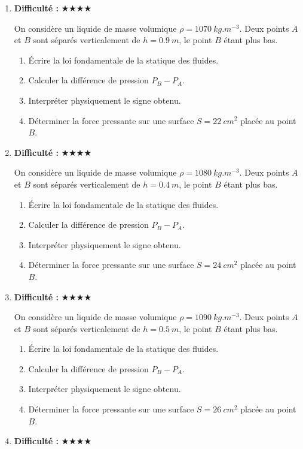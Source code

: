 \documentclass[11pt,a4paper]{article}
\newcommand{\etoiles}[1]{\textbf{Difficulté : }#1}
\begin{document}
\begin{enumerate}[label=\textbf{Exercice \arabic*.},leftmargin=*]
On considère un liquide de masse volumique $\rho=1060\ \si{kg.m^{-3}}$.
Deux points $A$ et $B$ sont séparés verticalement de $h=0.8\ \si{m}$, le point $B$ étant plus bas.
\begin{enumerate}[label=\alph*)]
\item Écrire la loi fondamentale de la statique des fluides.
\item Calculer la différence de pression $P_B-P_A$.
\item Interpréter physiquement le signe obtenu.
\item Déterminer la force pressante sur une surface $S=20\ \si{cm^2}$ placée au point $B$.
\end{enumerate}
\item \etoiles{★★★★}

On considère un liquide de masse volumique $\rho=1070\ \si{kg.m^{-3}}$.
Deux points $A$ et $B$ sont séparés verticalement de $h=0.9\ \si{m}$, le point $B$ étant plus bas.
\begin{enumerate}[label=\alph*)]
\item Écrire la loi fondamentale de la statique des fluides.
\item Calculer la différence de pression $P_B-P_A$.
\item Interpréter physiquement le signe obtenu.
\item Déterminer la force pressante sur une surface $S=22\ \si{cm^2}$ placée au point $B$.
\end{enumerate}
\item \etoiles{★★★★}

On considère un liquide de masse volumique $\rho=1080\ \si{kg.m^{-3}}$.
Deux points $A$ et $B$ sont séparés verticalement de $h=0.4\ \si{m}$, le point $B$ étant plus bas.
\begin{enumerate}[label=\alph*)]
\item Écrire la loi fondamentale de la statique des fluides.
\item Calculer la différence de pression $P_B-P_A$.
\item Interpréter physiquement le signe obtenu.
\item Déterminer la force pressante sur une surface $S=24\ \si{cm^2}$ placée au point $B$.
\end{enumerate}
\item \etoiles{★★★★}

On considère un liquide de masse volumique $\rho=1090\ \si{kg.m^{-3}}$.
Deux points $A$ et $B$ sont séparés verticalement de $h=0.5\ \si{m}$, le point $B$ étant plus bas.
\begin{enumerate}[label=\alph*)]
\item Écrire la loi fondamentale de la statique des fluides.
\item Calculer la différence de pression $P_B-P_A$.
\item Interpréter physiquement le signe obtenu.
\item Déterminer la force pressante sur une surface $S=26\ \si{cm^2}$ placée au point $B$.
\end{enumerate}
\item \etoiles{★★★★}


\end{enumerate}
\end{document}
